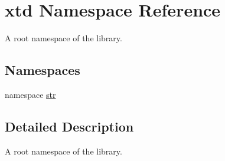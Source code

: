 \hypertarget{namespacextd}{\section{xtd Namespace Reference}
\label{namespacextd}
}


A root namespace of the library.  


\subsection*{Namespaces}
\begin{DoxyCompactItemize}
\item 
namespace \hyperlink{namespacextd_1_1str}{str}
\end{DoxyCompactItemize}


\subsection{Detailed Description}
A root namespace of the library. 